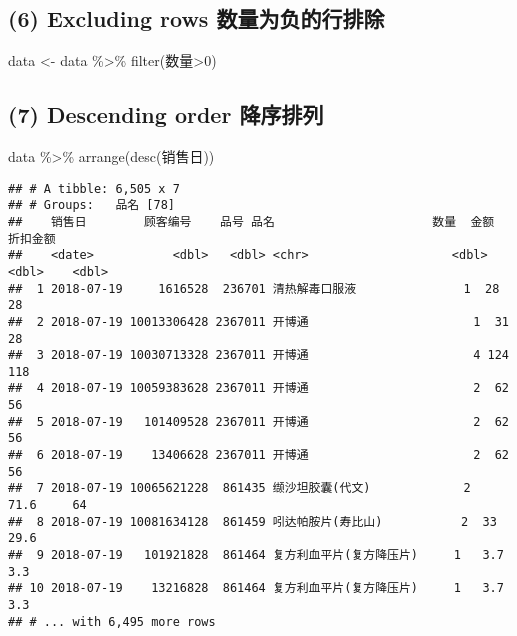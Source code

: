 \documentclass[
]{article}
\newenvironment{Shaded}{\begin{snugshade}}{\end{snugshade}}
\newcommand{\DecValTok}[1]{\textcolor[rgb]{0.00,0.00,0.81}{#1}}
\newcommand{\FunctionTok}[1]{\textcolor[rgb]{0.00,0.00,0.00}{#1}}
\newcommand{\NormalTok}[1]{#1}
\newcommand{\OtherTok}[1]{\textcolor[rgb]{0.56,0.35,0.01}{#1}}
\newcommand{\SpecialCharTok}[1]{\textcolor[rgb]{0.00,0.00,0.00}{#1}}
\begin{document}
\hypertarget{excluding-rows-ux6570ux91cfux4e3aux8d1fux7684ux884cux6392ux9664}{%
\subsection{(6) Excluding rows
数量为负的行排除}\label{excluding-rows-ux6570ux91cfux4e3aux8d1fux7684ux884cux6392ux9664}}

\begin{Shaded}
\begin{Highlighting}[]
\NormalTok{data }\OtherTok{\textless{}{-}}\NormalTok{ data }\SpecialCharTok{\%\textgreater{}\%} \FunctionTok{filter}\NormalTok{(数量}\SpecialCharTok{\textgreater{}}\DecValTok{0}\NormalTok{)}
\end{Highlighting}
\end{Shaded}

\hypertarget{descending-order-ux964dux5e8fux6392ux5217}{%
\subsection{(7) Descending order
降序排列}\label{descending-order-ux964dux5e8fux6392ux5217}}

\begin{Shaded}
\begin{Highlighting}[]
\NormalTok{data }\SpecialCharTok{\%\textgreater{}\%} \FunctionTok{arrange}\NormalTok{(}\FunctionTok{desc}\NormalTok{(销售日))}
\end{Highlighting}
\end{Shaded}

\begin{verbatim}
## # A tibble: 6,505 x 7
## # Groups:   品名 [78]
##    销售日        顾客编号    品号 品名                      数量  金额 折扣金额
##    <date>           <dbl>   <dbl> <chr>                    <dbl> <dbl>    <dbl>
##  1 2018-07-19     1616528  236701 清热解毒口服液               1  28       28  
##  2 2018-07-19 10013306428 2367011 开博通                       1  31       28  
##  3 2018-07-19 10030713328 2367011 开博通                       4 124      118  
##  4 2018-07-19 10059383628 2367011 开博通                       2  62       56  
##  5 2018-07-19   101409528 2367011 开博通                       2  62       56  
##  6 2018-07-19    13406628 2367011 开博通                       2  62       56  
##  7 2018-07-19 10065621228  861435 缬沙坦胶囊(代文)             2  71.6     64  
##  8 2018-07-19 10081634128  861459 吲达帕胺片(寿比山)           2  33       29.6
##  9 2018-07-19   101921828  861464 复方利血平片(复方降压片)     1   3.7      3.3
## 10 2018-07-19    13216828  861464 复方利血平片(复方降压片)     1   3.7      3.3
## # ... with 6,495 more rows
\end{verbatim}
\end{document}
